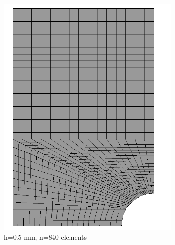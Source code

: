 \documentclass[12pt,twoside]{report}
\begin{document}
\begin{figure}[htbp!]
\begin{subfigure}{0.27\textwidth}
         \includegraphics[width=1.27\textwidth]{25.0.5mm2.png}
         \caption{h=0.5 mm, n=840 elements}
         \label{fig:0.5mm}
     \end{subfigure}
     \hfill
     \begin{subfigure}{0.27\textwidth}

\end{subfigure}
\end{figure}
\end{document}
